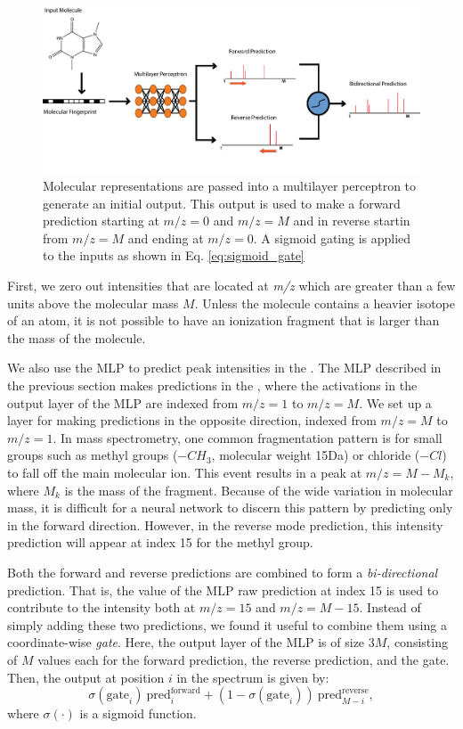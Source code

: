 \begin{figure}[h]
    \centering
    \includegraphics[width=0.8\linewidth]{Model_prediction.png}
    \caption[Neural Electron Ionization MS Prediction Model]{Molecular representations are passed into a multilayer perceptron to generate an initial output. This output is used to make a forward prediction starting at $\textit{m/z}=0$ and $\textit{m/z}=M$ and in reverse startin from $\textit{m/z}=M$ and ending at $\textit{m/z}=0$. A sigmoid gating is applied to the inputs as shown in Eq. \ref{eq:sigmoid_gate}}
    \label{fig:model_prediction}
\end{figure}

First, we zero out intensities that are located at \textit{m/z} which are greater than a few units above the molecular mass $M$. Unless the molecule contains a heavier isotope of an atom, it is not possible to have an ionization fragment that is larger than the mass of the molecule.

We also use the MLP to predict peak intensities in the .  The MLP described in the previous section makes predictions in the , where the activations in the output layer of the MLP are indexed from $m/z = 1$ to $m/z = M$. We set up a layer for making predictions in the opposite direction, indexed from $m/z = M$ to $m/z = 1$. In mass spectrometry, one common fragmentation pattern is for small groups such as methyl groups ($-CH_3$, molecular weight 15Da) or chloride ($-Cl$) to fall off the main molecular ion. This event results in a peak at $m/z = M - M_k$, where $M_k$ is the mass of the fragment. Because of the wide variation in molecular mass, it is difficult for a neural network to discern this pattern by predicting only in the forward direction. However, in the reverse mode prediction, this intensity prediction will appear at index 15 for the methyl group.

Both the forward and reverse predictions are  combined to form a \textit{bi-directional} prediction. That is, the value of the MLP raw prediction at index 15 is used to contribute to the intensity both at $m/z = 15$ and $m/z = M - 15$. Instead of simply adding these two predictions, we found it useful to combine them using a coordinate-wise \textit{gate}. Here, the output layer of the MLP is of size $3M$, consisting of $M$ values each for the forward prediction, the reverse prediction, and the gate. Then, the output at position $i$ in the spectrum is given by:
\begin{equation}\label{eq:sigmoid_gate}
\sigma(\text{gate}_i) ~ \text{pred}^\text{forward}_i + (1 - \sigma(\text{gate}_i)) ~ \text{pred}^\text{reverse}_{M - i},
\end{equation}
where $\sigma(\cdot)$ is a sigmoid function.

